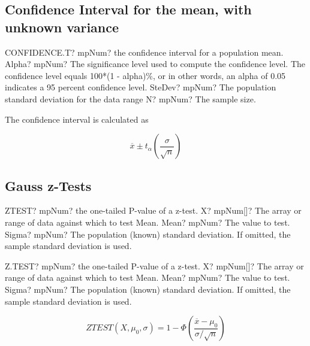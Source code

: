 \subsection{Confidence Interval for the mean, with unknown variance}

\begin{mpFunctionsExtract}
	\mpWorksheetFunctionThreeNotImplemented
	{CONFIDENCE.T? mpNum? the confidence interval for a population mean.}
	{Alpha? mpNum? The significance level used to compute the confidence level. The confidence level equals 100*(1 - alpha)\%, or in other words, an alpha of 0.05 indicates a 95 percent confidence level.
	}
	{SteDev? mpNum? The population standard deviation for the data range}
	{N? mpNum? The sample size.}
\end{mpFunctionsExtract}

The confidence interval is calculated as

\begin{equation}
	\overline{x} \pm t_{\alpha} \left(\frac{\sigma}{\sqrt{n}} \right)
\end{equation}



\subsection{Gauss z-Tests}

\begin{mpFunctionsExtract}
	\mpWorksheetFunctionThreeNotImplemented
	{ZTEST? mpNum? the one-tailed P-value of a z-test.}
	{X? mpNum[]? The array or range of data against which to test Mean.}
	{Mean? mpNum? The value to test.}
	{Sigma? mpNum? The population (known) standard deviation. If omitted, the sample standard deviation is used.}
\end{mpFunctionsExtract}


\vspace{0.6cm}
\begin{mpFunctionsExtract}
	\mpWorksheetFunctionThreeNotImplemented
	{Z.TEST? mpNum? the one-tailed P-value of a z-test.}
	{X? mpNum[]? The array or range of data against which to test Mean.}
	{Mean? mpNum? The value to test.}
	{Sigma? mpNum? The population (known) standard deviation. If omitted, the sample standard deviation is used.}
\end{mpFunctionsExtract}


\begin{equation}
	ZTEST(X, \mu_0, \sigma) = 1 - \Phi \left(\frac{\overline{x} - \mu_0}{\sigma / \sqrt{n}} \right)
\end{equation}

